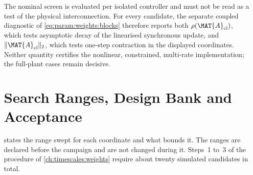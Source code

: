 The nominal screen is evaluated per isolated controller and must not be read as a test of the physical interconnection.
For every candidate, the separate coupled diagnostic of \cref{eq:param:weights:blocks} therefore reports both $\rho(\MAT{A}_{\mathrm{cl}})$, which tests asymptotic decay of the linearised synchronous update, and $\lVert\MAT{A}_{\mathrm{cl}}\rVert_{2}$, which tests one-step contraction in the displayed coordinates.
Neither quantity certifies the nonlinear, constrained, multi-rate implementation; the full-plant cases remain decisive.

\section{Search Ranges, Design Bank and Acceptance}\label{ch:app_bo:scenarios}
\label{ch:ofo:tuning:bo:scenarios}%
\label{ch:app_bo:tpe}%
\label{ch:ofo:tuning:bo:loop}%
\label{ch:app_wsel:ranges}%

 states the range swept for each coordinate and what bounds it.
The ranges are declared before the campaign and are not changed during it.
Steps~1 to~3 of the procedure of \cref{ch:timescales:weights} require about twenty simulated candidates in total.

